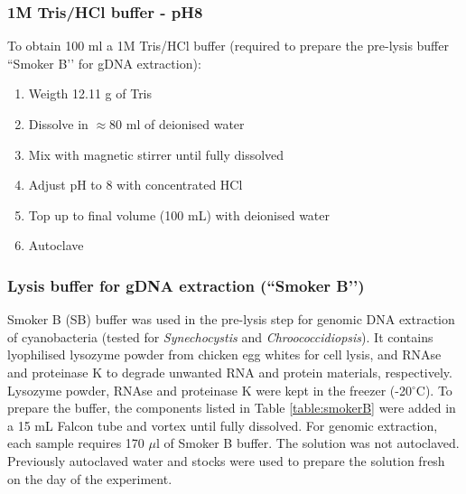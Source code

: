 \documentclass[12pt]{article}
\begin{document}
\subsubsection{1M Tris/HCl buffer - pH8}
To obtain 100 ml a 1M Tris/HCl buffer (required to prepare the pre-lysis buffer ``Smoker B’’ for gDNA extraction):
\begin{enumerate}
	\item Weigth 12.11 g of Tris
	\item Dissolve in $\approx$80 ml of deionised water
	\item Mix with magnetic stirrer until fully dissolved
	\item Adjust pH to 8 with concentrated HCl
	\item Top up to final volume (100 mL) with deionised water
	\item Autoclave
\end{enumerate} 

\subsubsection{Lysis buffer for gDNA extraction (``Smoker B’’)}\label{SBuffer}
Smoker B (SB) buffer was used in the pre-lysis step for genomic DNA extraction of cyanobacteria (tested for \textit{Synechocystis} and \textit{Chroococcidiopsis}). It contains lyophilised lysozyme powder from chicken egg whites for cell lysis, and RNAse and proteinase K to degrade unwanted RNA and protein materials, respectively. Lysozyme powder, RNAse and proteinase K were kept in the freezer (-20$^{\circ}$C). To prepare the buffer, the components listed in Table \ref{table:smokerB} were added in a 15 mL Falcon tube and vortex until fully dissolved. For genomic extraction, each sample requires 170 $\mu$l of Smoker B buffer. The solution was not autoclaved. Previously autoclaved water and stocks were used to prepare the solution fresh on the day of the experiment. 
\end{document}
